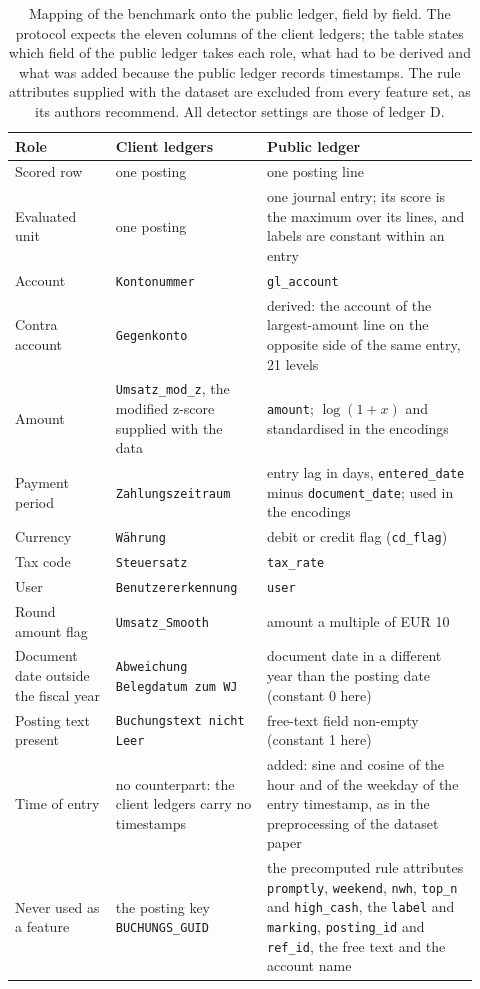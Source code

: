\begin{table}[tbp]
\caption{Mapping of the benchmark onto the public ledger, field by field. The protocol expects the eleven columns of the client ledgers; the table states which field of the public ledger takes each role, what had to be derived and what was added because the public ledger records timestamps. The rule attributes supplied with the dataset are excluded from every feature set, as its authors recommend. All detector settings are those of ledger D.}
\label{tab:s-mapping}
\centering
\footnotesize
\begin{tabular}{@{}>{\raggedright\arraybackslash}p{0.2\linewidth}>{\raggedright\arraybackslash}p{0.3\linewidth}>{\raggedright\arraybackslash}p{0.42\linewidth}@{}}
\toprule
Role & Client ledgers & Public ledger \\
\midrule
Scored row & one posting & one posting line \\
Evaluated unit & one posting & one journal entry; its score is the maximum over its lines, and labels are constant within an entry \\
Account & \texttt{Kontonummer} & \texttt{gl\_account} \\
Contra account & \texttt{Gegenkonto} & derived: the account of the largest-amount line on the opposite side of the same entry, 21 levels \\
Amount & \texttt{Umsatz\_mod\_z}, the modified z-score supplied with the data & \texttt{amount}; $\log(1+x)$ and standardised in the encodings \\
Payment period & \texttt{Zahlungszeitraum} & entry lag in days, \texttt{entered\_date} minus \texttt{document\_date}; used in the encodings \\
Currency & \texttt{W\"ahrung} & debit or credit flag (\texttt{cd\_flag}) \\
Tax code & \texttt{Steuersatz} & \texttt{tax\_rate} \\
User & \texttt{Benutzererkennung} & \texttt{user} \\
Round amount flag & \texttt{Umsatz\_Smooth} & amount a multiple of EUR 10 \\
Document date outside the fiscal year & \texttt{Abweichung Belegdatum zum WJ} & document date in a different year than the posting date (constant 0 here) \\
Posting text present & \texttt{Buchungstext nicht Leer} & free-text field non-empty (constant 1 here) \\
Time of entry & no counterpart: the client ledgers carry no timestamps & added: sine and cosine of the hour and of the weekday of the entry timestamp, as in the preprocessing of the dataset paper \\
Never used as a feature & the posting key \texttt{BUCHUNGS\_GUID} & the precomputed rule attributes \texttt{promptly}, \texttt{weekend}, \texttt{nwh}, \texttt{top\_n} and \texttt{high\_cash}, the \texttt{label} and \texttt{marking}, \texttt{posting\_id} and \texttt{ref\_id}, the free text and the account name \\
\bottomrule
\end{tabular}
\end{table}
